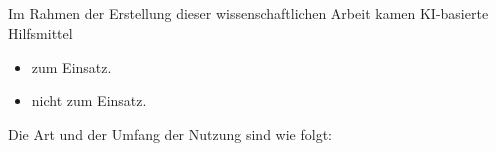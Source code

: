 \newpage
\begin{otherlanguage}{ngerman}
\thispagestyle{empty}
\section*{}
\thispagestyle{empty}

Im Rahmen der Erstellung dieser wissenschaftlichen Arbeit kamen KI-basierte Hilfsmittel

\begin{itemize}
  \item[$\boxtimes$] zum Einsatz.
  \item[$\square$] nicht zum Einsatz.
\end{itemize}

Die Art und der Umfang der Nutzung sind wie folgt:

\vspace{1\baselineskip}


\end{otherlanguage}
